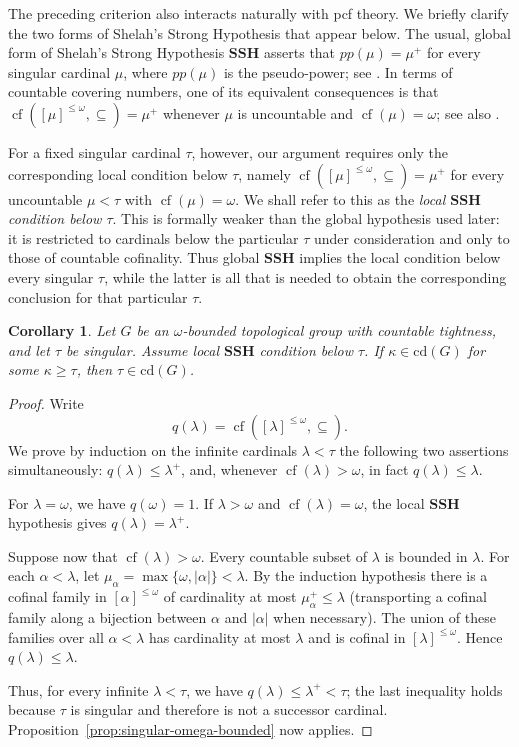 \documentclass[12pt]{amsart}
\newtheorem{corollary}[theorem]{Corollary}
\theoremstyle{definition}
\numberwithin{equation}{section}
\theoremstyle{remark}
\def\cd{\mathrm{cd}}
\def\cof{\operatorname{cf}}
\begin{document}
The preceding criterion also interacts naturally with pcf theory.
We briefly clarify the two forms of Shelah's Strong Hypothesis that appear
below. The usual, global form of Shelah's Strong Hypothesis
$\mathbf{SSH}$ asserts that $pp(\mu)=\mu^+$ for every singular cardinal
$\mu$, where $pp(\mu)$ is the pseudo-power; see \cite{ShelahCA}. In terms of countable covering numbers, one of
its equivalent consequences is that
$\operatorname{cf}([\mu]^{\leq\omega},\subseteq)=\mu^+$ whenever
$\mu$ is uncountable and $\cof(\mu)=\omega$; see also
\cite{EFHST}.

For a fixed singular cardinal $\tau$, however, our argument requires only
the corresponding local condition below $\tau$, namely
$\operatorname{cf}([\mu]^{\leq\omega},\subseteq)=\mu^+$ for every
uncountable $\mu<\tau$ with $\operatorname{cf}(\mu)=\omega$.
We shall refer to this as the \emph{local $\mathbf{SSH}$ condition below
$\tau$}. This is formally weaker than the global hypothesis used later:
it is restricted to cardinals below the particular $\tau$ under
consideration and only to those of countable cofinality. Thus global
$\mathbf{SSH}$ implies the local condition below every singular
$\tau$, while the latter is all that is needed to obtain the corresponding
conclusion for that particular $\tau$.

\begin{corollary}\label{cor:local-ssh}
Let $G$ be an $\omega$-bounded topological group with countable tightness,
and let $\tau$ be singular. Assume local $\mathbf{SSH}$ condition below
$\tau$. If $\kappa\in\cd(G)$ for some
$\kappa\geq\tau$, then $\tau\in\cd(G)$.
\end{corollary}

\begin{proof}
Write
\[
q(\lambda)=\operatorname{cf}([\lambda]^{\leq\omega},\subseteq).
\]
We prove by induction on the infinite cardinals $\lambda<\tau$ the following two assertions simultaneously:
$q(\lambda)\leq\lambda^+$, and, whenever $\operatorname{cf}(\lambda)>\omega$, in fact $q(\lambda)\leq\lambda$.

For $\lambda=\omega$, we have $q(\omega)=1$. If $\lambda>\omega$ and $\operatorname{cf}(\lambda)=\omega$, the local $\mathbf{SSH}$ hypothesis gives $q(\lambda)=\lambda^+$.

Suppose now that $\operatorname{cf}(\lambda)>\omega$. Every countable subset of $\lambda$ is bounded in $\lambda$. For each $\alpha<\lambda$, let $\mu_\alpha=\max\{\omega,|\alpha|\}<\lambda$. By the induction hypothesis there is a cofinal family in $[\alpha]^{\leq\omega}$ of cardinality at most $\mu_\alpha^+\leq\lambda$ (transporting a cofinal family along a bijection between $\alpha$ and $|\alpha|$ when necessary). The union of these families over all $\alpha<\lambda$ has cardinality at most $\lambda$ and is cofinal in $[\lambda]^{\leq\omega}$. Hence $q(\lambda)\leq\lambda$.

Thus, for every infinite $\lambda<\tau$, we have $q(\lambda)\leq\lambda^+<\tau$; the last inequality holds because $\tau$ is singular and therefore is not a successor cardinal. Proposition~\ref{prop:singular-omega-bounded} now applies.
\end{proof}
\end{document}
